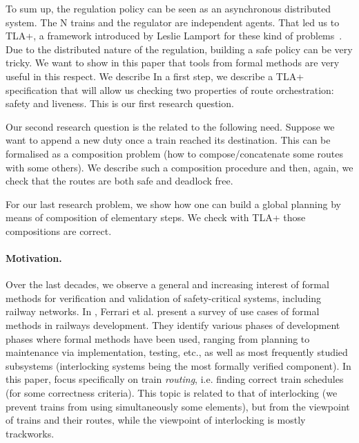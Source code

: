 \documentclass[runningheads]{llncs}
\begin{document}
 
 
 To sum up, the regulation policy can be seen as an asynchronous distributed system. The N trains and the regulator are independent agents. That led us to TLA+, a framework introduced by Leslie Lamport for these kind of problems~\cite{Lamport}.  
Due to the distributed nature of the regulation, building a safe policy can be very tricky. We want to show in this paper that tools from formal methods are very useful in this respect. We describe In a first step, we describe a TLA+ specification that will allow us checking two properties of route orchestration: safety and liveness. This is our first research question. 

Our second research question is the related to the following need. Suppose we want to append a new duty once a train reached its destination. This can be formalised as a composition problem (how to compose/concatenate some routes with some others). We describe such a composition procedure and then, again, we check that the routes are both safe and deadlock free. 

For our last research problem, we show how one can build a global planning by means of composition of elementary steps. We check with TLA+ those compositions are correct. 

\paragraph{Motivation.}

Over the last decades, we observe a general and increasing interest of formal methods for verification and validation of safety-critical systems, including railway networks.
In \cite{Ferrari_Formal_2022}, Ferrari et al. present a survey of use cases of formal methods in railways development. They identify various phases of development phases where formal methods have been used, ranging from planning to maintenance via implementation, testing, etc., as well as most frequently studied subsystems (interlocking systems being the most formally verified component). In this paper, focus specifically on train \emph{routing}, i.e. finding correct train schedules (for some correctness criteria). This topic is related to that of interlocking (we prevent trains from using simultaneously some elements), but from the viewpoint of trains and their routes, while the viewpoint of interlocking is mostly trackworks.
\end{document}
